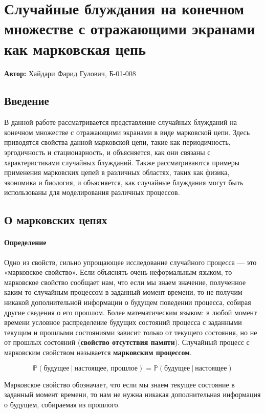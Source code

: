 
\section{Случайные блуждания на конечном множестве с отражающими экранами как марковская цепь}

\textbf{Автор:} Хайдари Фарид Гулович, Б-01-008

\subsection{Введение}
В данной работе рассматривается представление случайных блужданий на конечном множестве с отражающими экранами в виде марковской цепи. Здесь приводятся свойства данной марковской цепи, такие как периодичность, эргодичность и стационарность, и объясняется, как они связаны с характеристиками случайных блужданий. Также рассматриваются примеры применения марковских цепей в различных областях, таких как физика, экономика и биология, и объясняется, как случайные блуждания могут быть использованы для моделирования различных процессов.

\subsection{О марковских цепях}

\paragraph{Определение}

Одно из свойств, сильно упрощающее исследование случайного процесса — это «марковское свойство». Если объяснять очень неформальным языком, то марковское свойство сообщает нам, что если мы знаем значение, полученное каким-то случайным процессом в заданный момент времени, то не получим никакой дополнительной информации о будущем поведении процесса, собирая другие сведения о его прошлом. Более математическим языком: в любой момент времени условное распределение будущих состояний процесса с заданными текущим и прошлыми состояниями зависит только от текущего состояния, но не от прошлых состояний (\textbf{свойство отсутствия памяти}). Случайный процесс с марковским свойством называется \textbf{марковским процессом}.

$$
\mathbb{P}(\text{будущее} \  | \  \text{настоящее, прошлое}) = \mathbb{P}(\text{будущее} \  | \  \text{настоящее})
$$

Марковское свойство обозначает, что если мы знаем текущее состояние в заданный момент времени, то нам не нужна никакая дополнительная информация о будущем, собираемая из прошлого.

